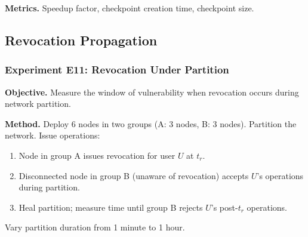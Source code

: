 \textbf{Metrics.} Speedup factor, checkpoint creation time, checkpoint size.



\subsection{Revocation Propagation}\label{subsec:revocation-latency}

\subsubsection{Experiment E11: Revocation Under Partition}
\textbf{Objective.} Measure the window of vulnerability when revocation occurs during network partition.

\textbf{Method.} Deploy 6 nodes in two groups (A: 3 nodes, B: 3 nodes). Partition the network. Issue operations:
\begin{enumerate}
    \item Node in group A issues revocation for user $U$ at $t_r$.
    \item Disconnected node in group B (unaware of revocation) accepts $U$'s operations during partition.
    \item Heal partition; measure time until group B rejects $U$'s post-$t_r$ operations.
\end{enumerate}
Vary partition duration from 1 minute to 1 hour.

